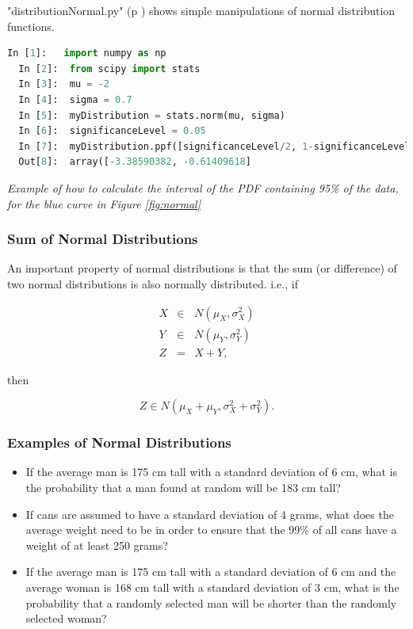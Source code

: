 \vspace{5 mm}

\PyImg "distributionNormal.py" (p \pageref{py:distributionNormal}) shows simple manipulations of normal distribution functions.

\begin{lstlisting}[language=Python]
  In [1]:   import numpy as np
  In [2]:  from scipy import stats
  In [3]:  mu = -2
  In [4]:  sigma = 0.7
  In [5]:  myDistribution = stats.norm(mu, sigma)
  In [6]:  significanceLevel = 0.05
  In [7]:  myDistribution.ppf([significanceLevel/2, 1-significanceLevel/2])
  Out[8]:  array([-3.38590382, -0.61409618]
\end{lstlisting}

\emph{Example of how to calculate the interval of the PDF containing 95\% of the data, for the blue curve in Figure \ref{fig:normal}}

\subsubsection{Sum of Normal Distributions}

An important property of normal distributions is that the sum (or difference) of two normal distributions is also normally distributed. i.e., if

\begin{eqnarray*}
    X &\in& N(\mu_X, \sigma_X^2) \\
    Y &\in& N(\mu_Y, \sigma_Y^2) \\
    Z &=& X + Y,
\end{eqnarray*}

then

\begin{equation}\label{eq:sumOfGaussians}
    Z \in N(\mu_X + \mu_Y, \sigma_X^2 + \sigma_Y^2).
\end{equation}

\subsubsection{Examples of Normal Distributions}

\begin{itemize}
    \item If the average man is 175 cm tall with a standard deviation of 6 cm, what is the probability that a man found at random will be 183 cm tall?
    \item If cans are assumed to have a standard deviation of 4 grams, what does the average weight need to be in order to ensure that the 99\% of all cans have a weight of at least 250 grams?
   \item If the average man is 175 cm tall with a standard deviation of 6 cm and the average woman is 168 cm tall with a standard deviation of 3 cm, what is the probability that a randomly selected man will be shorter than the randomly selected woman?
\end{itemize}

